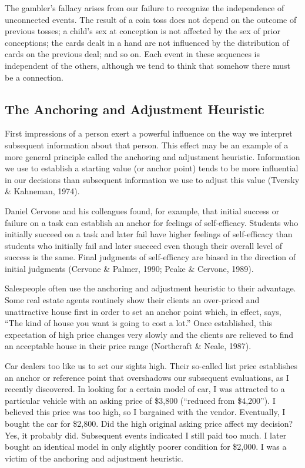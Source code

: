 \documentclass[
]{book}
\begin{document}
The gambler's fallacy arises from our failure to recognize the independence of unconnected events. The result of a coin toss does not depend on the outcome of previous tosses; a child's sex at conception is not affected by the sex of prior conceptions; the cards dealt in a hand are not influenced by the distribution of cards on the previous deal; and so on. Each event in these sequences is independent of the others, although we tend to think that somehow there must be a connection.

\hypertarget{the-anchoring-and-adjustment-heuristic}{%
\subsection*{The Anchoring and Adjustment Heuristic}\label{the-anchoring-and-adjustment-heuristic}}

First impressions of a person exert a powerful influence on the way we interpret subsequent information about that person. This effect may be an example of a more general principle called the anchoring and adjustment heuristic. Information we use to establish a starting value (or anchor point) tends to be more influential in our decisions than subsequent information we use to adjust this value (Tversky \& Kahneman, 1974).

Daniel Cervone and his colleagues found, for example, that initial success or failure on a task can establish an anchor for feelings of self-efficacy. Students who initially succeed on a task and later fail have higher feelings of self-efficacy than students who initially fail and later succeed even though their overall level of success is the same. Final judgments of self-efficacy are biased in the direction of initial judgments (Cervone \& Palmer, 1990; Peake \& Cervone, 1989).

Salespeople often use the anchoring and adjustment heuristic to their advantage. Some real estate agents routinely show their clients an over-priced and unattractive house first in order to set an anchor point which, in effect, says, ``The kind of house you want is going to cost a lot.'' Once established, this expectation of high price changes very slowly and the clients are relieved to find an acceptable house in their price range (Northcraft \& Neale, 1987).

Car dealers too like us to set our sights high. Their so-called list price establishes an anchor or reference point that overshadows our subsequent evaluations, as I recently discovered. In looking for a certain model of car, I was attracted to a particular vehicle with an asking price of \$3,800 (``reduced from \$4,200''). I believed this price was too high, so I bargained with the vendor. Eventually, I bought the car for \$2,800. Did the high original asking price affect my decision? Yes, it probably did. Subsequent events indicated I still paid too much. I later bought an identical model in only slightly poorer condition for \$2,000. I was a victim of the anchoring and adjustment heuristic.
\end{document}
